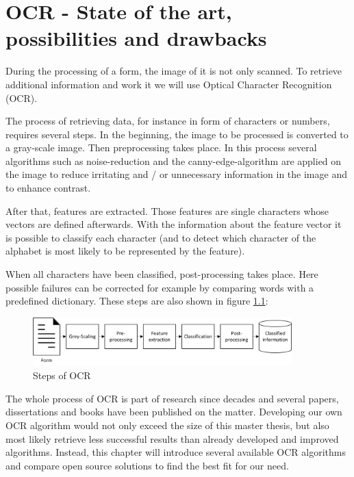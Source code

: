 %
% 
\chapter{OCR - State of the art, possibilities and drawbacks}
\label{cha3}

During the processing of a form, the image of it is not only scanned. To retrieve additional information and work it we will use Optical Character Recognition (OCR).

The process of retrieving data, for instance in form of characters or numbers, requires several steps. In the beginning, the image to be processed is converted to a gray-scale image. Then preprocessing takes place. In this process several algorithms such as noise-reduction and the canny-edge-algorithm are applied on the image to reduce irritating and / or unnecessary information in the image and to enhance contrast.

After that, features are extracted. Those features are single characters whose vectors are defined afterwards. With the information about the feature vector it is possible to classify each character (and to detect which character of the alphabet is most likely to be represented by the feature).

When all characters have been classified, post-processing takes place. Here possible failures can be corrected for example by comparing words with a predefined dictionary.
These steps are also shown in figure \ref{ocrSteps}:

\begin{figure}[ht!]
\centering
\includegraphics[width=100mm]{Images/OCR/Steps_Of_OCR.jpg}
\caption{Steps of OCR \label{ocrSteps}}
\end{figure}

The whole process of OCR is part of research since decades and several papers, dissertations and books have been published on the matter. Developing our own OCR algorithm would not only exceed the size of this master thesis, but also most likely retrieve less successful results than already developed and improved algorithms. Instead, this chapter will introduce several available OCR algorithms and compare open source solutions to find the best fit for our need.

